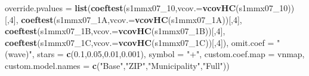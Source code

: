 \documentclass[
]{article}
\newenvironment{Shaded}{\begin{snugshade}}{\end{snugshade}}
\newcommand{\DataTypeTok}[1]{\textcolor[rgb]{0.13,0.29,0.53}{#1}}
\newcommand{\DecValTok}[1]{\textcolor[rgb]{0.00,0.00,0.81}{#1}}
\newcommand{\FloatTok}[1]{\textcolor[rgb]{0.00,0.00,0.81}{#1}}
\newcommand{\KeywordTok}[1]{\textcolor[rgb]{0.13,0.29,0.53}{\textbf{#1}}}
\newcommand{\NormalTok}[1]{#1}
\newcommand{\StringTok}[1]{\textcolor[rgb]{0.31,0.60,0.02}{#1}}
\begin{document}
\begin{Shaded}
\begin{Highlighting}[]
          \DataTypeTok{override.pvalues =} \KeywordTok{list}\NormalTok{(}\KeywordTok{coeftest}\NormalTok{(s1mmx07_}\DecValTok{10}\NormalTok{,}\DataTypeTok{vcov.=}\KeywordTok{vcovHC}\NormalTok{(s1mmx07_}\DecValTok{10}\NormalTok{))[,}\DecValTok{4}\NormalTok{],}
                                  \KeywordTok{coeftest}\NormalTok{(s1mmx07_1A,}\DataTypeTok{vcov.=}\KeywordTok{vcovHC}\NormalTok{(s1mmx07_1A))[,}\DecValTok{4}\NormalTok{],}
                                  \KeywordTok{coeftest}\NormalTok{(s1mmx07_1B,}\DataTypeTok{vcov.=}\KeywordTok{vcovHC}\NormalTok{(s1mmx07_1B))[,}\DecValTok{4}\NormalTok{],}
                                  \KeywordTok{coeftest}\NormalTok{(s1mmx07_1C,}\DataTypeTok{vcov.=}\KeywordTok{vcovHC}\NormalTok{(s1mmx07_1C))[,}\DecValTok{4}\NormalTok{]),}
          \DataTypeTok{omit.coef =} \StringTok{"(wave)"}\NormalTok{, }\DataTypeTok{stars =} \KeywordTok{c}\NormalTok{(}\FloatTok{0.1}\NormalTok{,}\FloatTok{0.05}\NormalTok{,}\FloatTok{0.01}\NormalTok{,}\FloatTok{0.001}\NormalTok{), }\DataTypeTok{symbol =} \StringTok{"+"}\NormalTok{,}
          \DataTypeTok{custom.coef.map =}\NormalTok{ vnmap, }
          \DataTypeTok{custom.model.names =} \KeywordTok{c}\NormalTok{(}\StringTok{"Base"}\NormalTok{,}\StringTok{"ZIP"}\NormalTok{,}\StringTok{"Municipality"}\NormalTok{,}\StringTok{"Full"}\NormalTok{))}
\end{Highlighting}
\end{Shaded}
\end{document}
